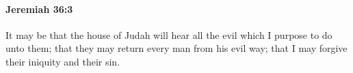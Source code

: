
		\paragraph{Jeremiah 36:3} %
			\label{JEREMIAH-36-3}

			It may be that the house of Judah will hear all the evil which I purpose to do unto them; that they may return every man from his evil way; that I may forgive their iniquity and their sin.


